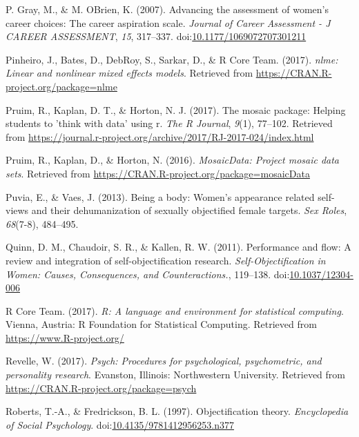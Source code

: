 \documentclass[man]{apa6}
\begin{document}
\hypertarget{ref-grayobrien2007}{}
P. Gray, M., \& M. OBrien, K. (2007). Advancing the assessment of
women's career choices: The career aspiration scale. \emph{Journal of
Career Assessment - J CAREER ASSESSMENT}, \emph{15}, 317--337.
doi:\href{https://doi.org/10.1177/1069072707301211}{10.1177/1069072707301211}

\hypertarget{ref-R-nlme}{}
Pinheiro, J., Bates, D., DebRoy, S., Sarkar, D., \& R Core Team. (2017).
\emph{nlme: Linear and nonlinear mixed effects models}. Retrieved from
\url{https://CRAN.R-project.org/package=nlme}

\hypertarget{ref-R-mosaic}{}
Pruim, R., Kaplan, D. T., \& Horton, N. J. (2017). The mosaic package:
Helping students to 'think with data' using r. \emph{The R Journal},
\emph{9}(1), 77--102. Retrieved from
\url{https://journal.r-project.org/archive/2017/RJ-2017-024/index.html}

\hypertarget{ref-R-mosaicData}{}
Pruim, R., Kaplan, D., \& Horton, N. (2016). \emph{MosaicData: Project
mosaic data sets}. Retrieved from
\url{https://CRAN.R-project.org/package=mosaicData}

\hypertarget{ref-puvia2013being}{}
Puvia, E., \& Vaes, J. (2013). Being a body: Women's appearance related
self-views and their dehumanization of sexually objectified female
targets. \emph{Sex Roles}, \emph{68}(7-8), 484--495.

\hypertarget{ref-quinnetal}{}
Quinn, D. M., Chaudoir, S. R., \& Kallen, R. W. (2011). Performance and
flow: A review and integration of self-objectification research.
\emph{Self-Objectification in Women: Causes, Consequences, and
Counteractions.}, 119--138.
doi:\href{https://doi.org/10.1037/12304-006}{10.1037/12304-006}

\hypertarget{ref-R-base}{}
R Core Team. (2017). \emph{R: A language and environment for statistical
computing}. Vienna, Austria: R Foundation for Statistical Computing.
Retrieved from \url{https://www.R-project.org/}

\hypertarget{ref-R-psych}{}
Revelle, W. (2017). \emph{Psych: Procedures for psychological,
psychometric, and personality research}. Evanston, Illinois:
Northwestern University. Retrieved from
\url{https://CRAN.R-project.org/package=psych}

\hypertarget{ref-robertsfredrickson}{}
Roberts, T.-A., \& Fredrickson, B. L. (1997). Objectification theory.
\emph{Encyclopedia of Social Psychology}.
doi:\href{https://doi.org/10.4135/9781412956253.n377}{10.4135/9781412956253.n377}
\end{document}
